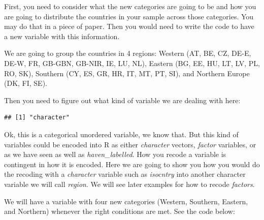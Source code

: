 \documentclass[
]{book}
\newenvironment{Shaded}{\begin{snugshade}}{\end{snugshade}}
\newcommand{\FunctionTok}[1]{\textcolor[rgb]{0.00,0.00,0.00}{#1}}
\newcommand{\NormalTok}[1]{#1}
\newcommand{\SpecialCharTok}[1]{\textcolor[rgb]{0.00,0.00,0.00}{#1}}
\begin{document}
First, you need to consider what the new categories are going to be and how you are going to distribute the countries in your sample across those categories. You may do that in a piece of paper. Then you would need to write the code to have a new variable with this information.

We are going to group the countries in 4 regions: Western (AT, BE, CZ, DE-E, DE-W, FR, GB-GBN, GB-NIR, IE, LU, NL), Eastern (BG, EE, HU, LT, LV, PL, RO, SK), Southern (CY, ES, GR, HR, IT, MT, PT, SI), and Northern Europe (DK, FI, SE).

Then you need to figure out what kind of variable we are dealing with here:

\begin{Shaded}
\end{Shaded}

\begin{verbatim}
## [1] "character"
\end{verbatim}

Ok, this is a categorical unordered variable, we know that. But this kind of variables could be encoded into R as either \emph{character} vectors, \emph{factor} variables, or as we have seen as well as \emph{haven\_labelled}. How you recode a variable is contingent in how it is encoded. Here we are going to show you how you would do the recoding with a \emph{character} variable such as \emph{isocntry} into another character variable we will call \emph{region}. We will see later examples for how to recode \emph{factors}.

We will have a variable with four new categories (Western, Southern, Eastern, and Northern) whenever the right conditions are met. See the code below:
\end{document}
